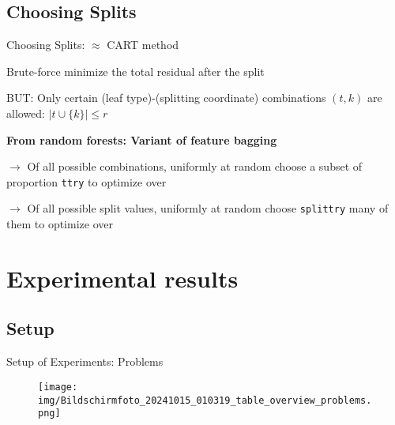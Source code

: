 \documentclass{beamer}
\begin{document}






\subsection{Choosing Splits}



\begin{frame}{Choosing Splits: \(\approx\) CART method}

    Brute-force minimize the total residual after the split

    BUT: Only certain (leaf type)-(splitting coordinate) combinations \((t, k)\) are allowed: \( \left| t \cup \{k\} \right| \leq r \)

    \vspace*{.5cm}

    \textbf{From random forests: Variant of feature bagging}

    \hspace*{.5cm} $\rightarrow$ Of all possible combinations, uniformly at random choose a subset of proportion \texttt{t\textunderscore try} to optimize over

    \hspace*{.5cm} $\rightarrow$ Of all possible split values, uniformly at random choose \texttt{split\textunderscore try} many of them to optimize over

\end{frame}



\section{Experimental results}



\subsection{Setup}

\begin{frame}{Setup of Experiments: Problems}

    \begin{figure}[h]
        \centering
        \vspace{-10pt} %
        \texttt{[image: img/Bildschirmfoto\_20241015\_010319\_table\_overview\_problems.png]}
        \vspace{-10pt}
        \label{fig:Figure_Ewald-MP_Algo_Structure}
    \end{figure}
    
\end{frame}
\end{document}
